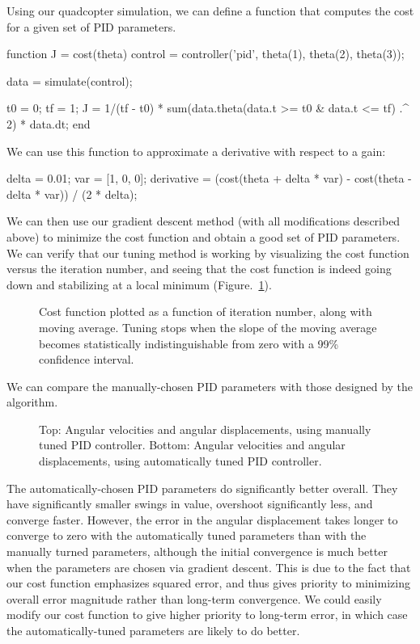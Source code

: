 \documentclass{article}
\begin{document}
Using our quadcopter simulation, we can define a function that computes the cost for a given set of
PID parameters.
\begin{matlabcode}
function J = cost(theta)
    control = controller('pid', theta(1), theta(2), theta(3));

    data = simulate(control);

    t0 = 0;
    tf = 1;
    J = 1/(tf - t0) * sum(data.theta(data.t >= t0 & data.t <= tf) .^ 2) * data.dt;
end
\end{matlabcode}
We can use this function to approximate a derivative with respect to a gain:
\begin{matlabcode}
delta = 0.01;
var = [1, 0, 0];
derivative = (cost(theta + delta * var) - cost(theta - delta * var)) / (2 * delta);
\end{matlabcode}
We can then use our gradient descent method (with all modifications described above) to minimize the
cost function and obtain a good set of PID parameters. We can verify that our tuning method is
working by visualizing the cost function versus the iteration number, and seeing that the cost
function is indeed going down and stabilizing at a local minimum (Figure.~\ref{train}).
\begin{figure}[H]
    \caption{
        Cost function plotted as a function of iteration number, along with moving average. 
        Tuning stops when the slope of the moving average becomes statistically indistinguishable
        from zero with a 99\% confidence interval.
    }
    \label{train}
\end{figure}
We can compare the manually-chosen PID parameters with those designed by the algorithm. 
\begin{figure}[H]
    \caption{
        Top: Angular velocities and angular displacements, using manually tuned PID controller.
        Bottom: Angular velocities and angular displacements, using automatically tuned PID
        controller.
    }
    \label{trained_pid}
\end{figure}
The automatically-chosen PID parameters do significantly better overall. They have significantly
smaller swings in value, overshoot significantly less, and converge faster. However, the error in
the angular displacement takes longer to converge to zero with the automatically tuned parameters
than with the manually turned parameters, although the initial convergence is much better when the
parameters are chosen via gradient descent. This is due to the fact that our cost function
emphasizes squared error, and thus gives priority to minimizing overall error magnitude rather than
long-term convergence. We could easily modify our cost function to give higher priority to long-term
error, in which case the automatically-tuned parameters are likely to do better.
\newpage
\end{document}
